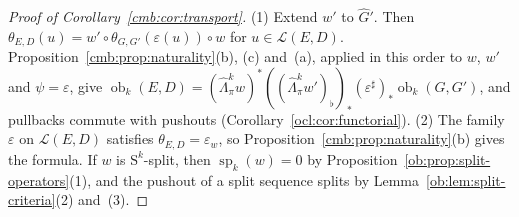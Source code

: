 \documentclass[11pt]{amsart}
\theoremstyle{definition}
\theoremstyle{remark}
\numberwithin{equation}{section}
\newcommand{\cL}{\mathcal L}
\theoremstyle{plain}
\theoremstyle{definition}
\theoremstyle{plain}
\newcommand{\ob}{\operatorname{ob}}
\begin{document}
\begin{proof}[Proof of Corollary~\ref{cmb:cor:transport}]
(1) Extend $w'$ to $\widehat G'$. Then $\theta_{E,D}(u)=w'\circ\theta_{G,G'}(\varepsilon(u))\circ w$ for $u\in\cL(E,D)$.
Proposition~\ref{cmb:prop:naturality}(b), (c) and~(a), applied in this order to $w$, $w'$ and $\psi=\varepsilon$, give
$\ob_k(E,D)=(\widehat\Lambda^k_\pi w)^*((\widehat\Lambda^k_\pi w')_\flat)_*(\varepsilon^\sharp)_*\ob_k(G,G')$, and pullbacks
commute with pushouts (Corollary~\ref{ocl:cor:functorial}). (2) The family $\varepsilon$ on $\cL(E,D)$ satisfies
$\theta_{E,D}=\varepsilon_w$, so Proposition~\ref{cmb:prop:naturality}(b) gives the formula. If $w$ is $\mathrm S^k$-split,
then $\operatorname{sp}_k(w)=0$ by Proposition~\ref{ob:prop:split-operators}(1), and the pushout of a split sequence splits by
Lemma~\ref{ob:lem:split-criteria}(2) and~(3).
\end{proof}
\end{document}
